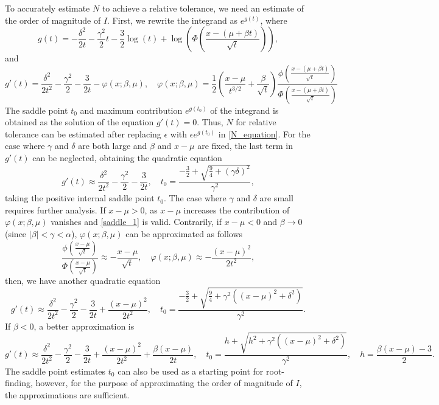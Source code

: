 \documentclass[10pt,a4paper,oneside]{article}
\numberwithin{equation}{section}
\begin{document}
To accurately estimate $N$ to achieve a relative tolerance, we need an estimate of the order of magnitude of $I$. First, we rewrite the integrand as $e^{g(t)}$, where
\begin{equation*}
g(t) = -\frac{\delta^2}{2t} - \frac{\gamma^2}{2}t - \frac{3}{2}\log(t) + \log\left(\Phi\left(\frac{x - (\mu +\beta t)}{\sqrt{t}}\right)\right),
\end{equation*}
and
\begin{equation*}
g'(t) = \frac{\delta^2}{2t^2} -\frac{\gamma^2}{2} -\frac{3}{2t} -\varphi(x; \beta, \mu),  \quad \varphi(x; \beta, \mu) = \frac{1}{2}\left(\frac{x-\mu}{t^{3/2}} + \frac{\beta}{\sqrt{t}} \right)\frac{\phi\left(\frac{x - (\mu +\beta t)}{\sqrt{t}}\right)}{\Phi\left(\frac{x - (\mu +\beta t)}{\sqrt{t}}\right)}
\end{equation*}
The saddle point $t_0$ and maximum contribution $e^{g(t_0)}$ of the integrand is obtained as the solution of the equation $g'(t) = 0$. Thus, $N$ for relative tolerance can be estimated after replacing $\epsilon$ with $\epsilon e^{g(t_0)}$ in \eqref{N_equation}. For the case where $\gamma$ and $\delta$ are both large and $\beta$ and $x-\mu$ are fixed, the last term in $g'(t)$ can be neglected, obtaining the quadratic equation
\begin{equation}\label{saddle_1}
g'(t) \approx \frac{\delta^2}{2t^2} -\frac{\gamma^2}{2} -\frac{3}{2t}, \quad t_0 = \frac{-\frac{3}{2} + \sqrt{\frac{9}{4} + (\gamma \delta)^2}}{\gamma^2},
\end{equation}
taking the positive internal saddle point $t_0$. The case where $\gamma$ and $\delta$ are small requires further analysis. If $x-\mu > 0$, as $x-\mu$ increases the contribution of $\varphi(x; \beta, \mu)$ vanishes and \eqref{saddle_1} is valid. Contrarily, if $x -\mu < 0$ and $\beta \to 0$ (since $|\beta| < \gamma < \alpha$), $\varphi(x; \beta, \mu)$ can be approximated as follows
\begin{equation*}
\frac{\phi\left(\frac{x - \mu}{\sqrt{t}}\right)}{\Phi\left(\frac{x - \mu}{\sqrt{t}}\right)} \approx -\frac{x - \mu}{\sqrt{t}}, \quad \varphi(x; \beta, \mu) \approx -\frac{(x-\mu)^2}{2t^2},
\end{equation*}
then, we have another quadratic equation
\begin{equation*}
g'(t) \approx \frac{\delta^2}{2t^2} -\frac{\gamma^2}{2} -\frac{3}{2t} + \frac{(x-\mu)^2}{2t^2}, \quad t_0 = \frac{-\frac{3}{2} + \sqrt{\frac{9}{4} + \gamma^2 \left((x-\mu)^2 + \delta^2\right)}}{\gamma^2}.
\end{equation*}
If $\beta < 0$, a better approximation is
\begin{equation*}
g'(t) \approx \frac{\delta^2}{2t^2} -\frac{\gamma^2}{2} -\frac{3}{2t} + \frac{(x-\mu)^2}{2t^2} + \frac{\beta(x-\mu)}{2t}, \quad t_0 = \frac{h + \sqrt{h^2 + \gamma^2 \left((x-\mu)^2 + \delta^2\right)}}{\gamma^2}, \quad h = \frac{\beta (x-\mu) - 3}{2}.
\end{equation*}
The saddle point estimates $t_0$ can also be used as a starting point for root-finding, however, for the purpose of approximating the order of magnitude of $I$, the approximations are sufficient.
\end{document}
